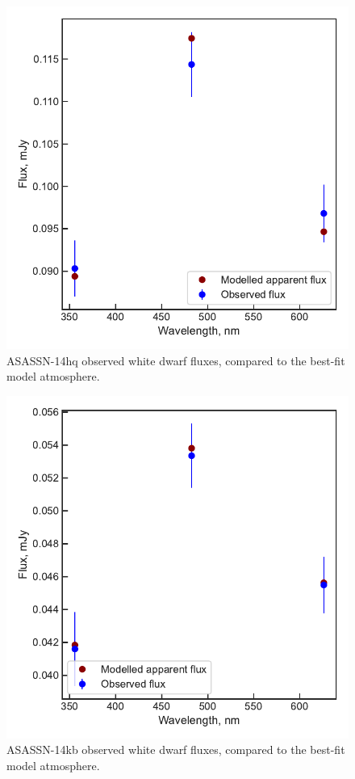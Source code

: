 \begin{figure}
    \centering
    \includegraphics[width=\textwidth]{figures/results/ASASSN-14hq/fluxplot.pdf}
    \caption{ASASSN-14hq observed white dwarf fluxes, compared to the best-fit model atmosphere.}
    \label{fig:ASASSN-14hq flux plot}
\end{figure}

\begin{figure}
    \centering
    \includegraphics[width=\textwidth]{figures/results/ASASSN-14kb/fluxplot.pdf}
    \caption{ASASSN-14kb observed white dwarf fluxes, compared to the best-fit model atmosphere.}
    \label{fig:ASASSN-14kb flux plot}
\end{figure}

